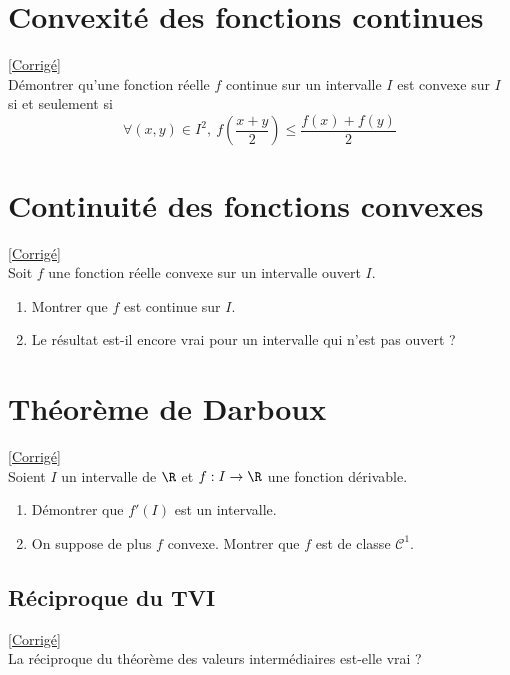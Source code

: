 \documentclass{book}
\begin{document}
	\section{Convexité des fonctions continues }
	\textcolor{blue}{\hyperref[Convexité des fonctions continues corrigé]{[Corrigé]}}\\
	\label{Convexité des fonctions continues}
	Démontrer qu'une fonction réelle $f$ continue sur un intervalle $I$ est convexe sur $I$ si et seulement si
	$$\forall (x,y)\in I^2,\ \displaystyle f\left(\frac{x+y}{2}\right)\leq \frac{f(x)+f(y)}{2}$$
	
	\section{Continuité des fonctions convexes }
	\textcolor{blue}{\hyperref[Continuité des fonctions convexes corrigé]{[Corrigé]}}\\
	\label{Continuité des fonctions convexes}
	Soit $f$ une fonction réelle convexe sur un intervalle ouvert $I$.
	\begin{enumerate}
		\item Montrer que $f$ est continue sur $I$.
		\item Le résultat est-il encore vrai pour un intervalle qui n'est pas ouvert ?
	\end{enumerate}
	
	\section{Théorème de Darboux }
	\textcolor{blue}{\hyperref[Théorème de Darboux corrigé]{[Corrigé]}}\\
	\label{Théorème de Darboux}
	Soient $I$ un intervalle de $\R$ et $f:I\to \R$ une fonction dérivable.
	\begin{enumerate}
		\item Démontrer que $f'(I)$ est un intervalle.
		\item On suppose de plus $f$ convexe. Montrer que $f$ est de classe $\mathcal C^1$.
	\end{enumerate}
	
	\subsection{Réciproque du TVI }
	\textcolor{blue}{\hyperref[Réciproque du TVI corrigé]{[Corrigé]}}\\
	\label{Réciproque du TVI}
	La réciproque du théorème des valeurs intermédiaires est-elle vrai ?
	
\end{document}
